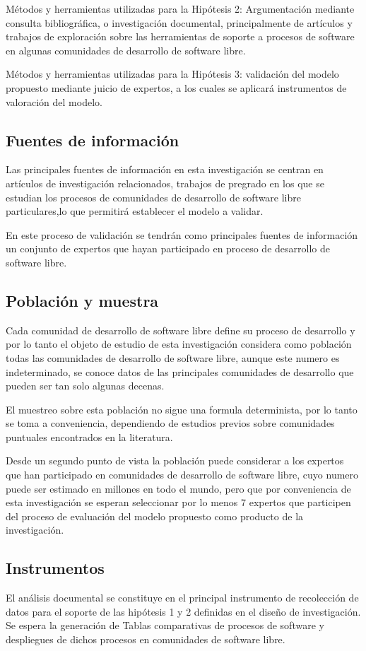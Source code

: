 Métodos y herramientas utilizadas para la Hipótesis 2: Argumentación mediante consulta bibliográfica, o investigación documental, principalmente de artículos y trabajos de exploración sobre las herramientas de soporte a procesos de software en algunas comunidades de desarrollo de software libre.

Métodos y herramientas utilizadas para la Hipótesis 3: validación del modelo propuesto mediante juicio de expertos, a los cuales se aplicará instrumentos de valoración del modelo.

\subsection{Fuentes de información}
Las principales fuentes de información en esta investigación se centran en artículos de investigación relacionados, trabajos de pregrado en los que se estudian los procesos de comunidades de desarrollo de software libre particulares,lo que permitirá establecer el modelo a validar.

En este proceso de validación se tendrán como principales fuentes de información un conjunto de expertos que hayan participado en proceso de desarrollo de software libre.

\subsection[Población y muestra]{Población y muestra}
Cada comunidad de desarrollo de software libre define su proceso de desarrollo y por lo tanto el objeto de estudio de esta investigación considera como población todas las comunidades de desarrollo de software libre, aunque este numero es indeterminado, se conoce datos de las principales comunidades de desarrollo que pueden ser tan solo algunas decenas.

El muestreo sobre esta población no sigue una formula determinista, por lo tanto se toma a conveniencia, dependiendo de estudios previos sobre comunidades puntuales encontrados en la literatura.

Desde un segundo punto de vista la población puede considerar a los expertos que han participado en comunidades de desarrollo de software libre, cuyo numero puede ser estimado en millones en todo el mundo, pero que por conveniencia de esta investigación se esperan seleccionar por lo menos 7 expertos que participen del proceso de evaluación del modelo propuesto como producto de la investigación.

\subsection{Instrumentos}
El análisis documental se constituye en el principal instrumento de recolección de datos para el soporte de las hipótesis 1 y 2 definidas en el diseño de investigación. Se espera la generación de Tablas comparativas de procesos de software y despliegues de dichos procesos en comunidades de software libre.

